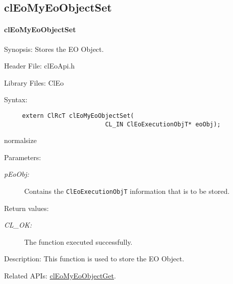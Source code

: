 \begin{flushleft}
  \newpage
\subsection{clEoMyEoObjectSet}
\hypertarget{pageeo118}{}\paragraph{cl\-Eo\-My\-Eo\-Object\-Set}\label{pageeo118}
\begin{Desc}
\item[Synopsis:]Stores the EO Object.\end{Desc}
\begin{Desc}
\item[Header File:]clEoApi.h\end{Desc}
\begin{Desc}
\item[Library Files:]Cl\-Eo\end{Desc}
\begin{Desc}
\item[Syntax:]

\footnotesize\begin{verbatim}     extern ClRcT clEoMyEoObjectSet(
                 			CL_IN ClEoExecutionObjT* eoObj);
\end{verbatim}
  normalsize
\end{Desc}
\begin{Desc}
\item[Parameters:]
\begin{description}
\item[{\em p\-Eo\-Obj:}]Contains the {\tt{Cl\-Eo\-Execution\-Obj\-T}} information that is to be stored.\end{description}
\end{Desc}
\begin{Desc}
\item[Return values:]
\begin{description}
\item[{\em CL\_\-OK:}]The function executed successfully.\end{description}
\end{Desc}
\begin{Desc}
\item[Description:]This function is used to store the EO Object.\end{Desc}
\begin{Desc}
\item[Related APIs:]\hyperlink{pageeo119}{cl\-Eo\-My\-Eo\-Object\-Get}. \end{Desc}





\end{flushleft}
